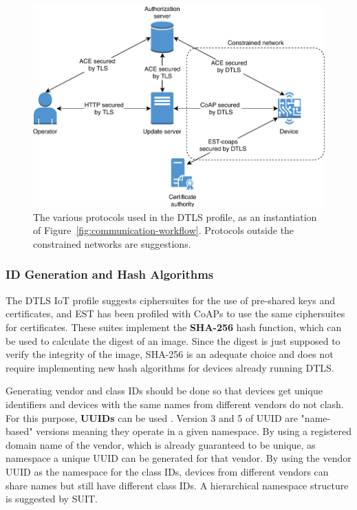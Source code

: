\documentclass[0-thesis.tex]{subfiles}
\begin{document}
\begin{figure}[h]
    \caption[The various protocols used in the DTLS profile.]
        {The various protocols used in the DTLS profile, as an instantiation of
            Figure~\ref{fig:communication-workflow}. Protocols outside the constrained networks are suggestions.}
    \label{fig:dtls-profile}
    \includegraphics{images/dtls-profile.pdf}
\end{figure}

\subsubsection{ID Generation and Hash Algorithms}
\label{sssec:hash-id-algorithm}
The DTLS IoT profile suggests ciphersuites for the use of pre-shared keys and
certificates, and EST has been profiled with CoAPs to use the same ciphersuites for
certificates. These suites implement the \textbf{SHA-256} hash function, which can be used
to calculate the digest of an image. Since the digest is just supposed to verify the
integrity of the image, SHA-256 is an adequate choice and does not require implementing
new hash algorithms for devices already running DTLS.

Generating vendor and class IDs should be done so that devices get unique identifiers and
devices with the same names from different vendors do not clash. For this purpose,
\textbf{UUIDs} can be used \parencite{rfc4122}. Version 3 and 5 of UUID are "name-based"
versions meaning they operate in a given namespace. By using a registered domain name of
the vendor, which is already guaranteed to be unique, as namespace a unique UUID can be
generated for that vendor. By using the vendor UUID as the namespace for the class IDs,
devices from different vendors can share names but still have different class IDs. A
hierarchical namespace structure is suggested by SUIT.
\end{document}

